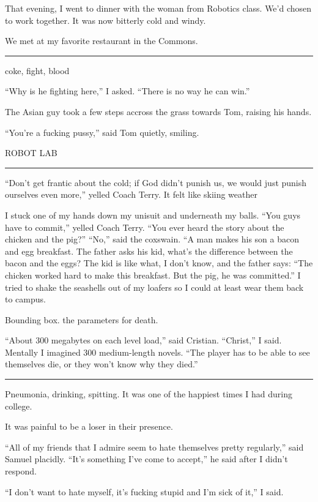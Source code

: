 That evening, I went to dinner with the woman from Robotics class.  We'd chosen
to work together.  It was now bitterly cold and windy.

We met at my favorite restaurant in the Commons.

\plainfancybreak{12pt}{2}{* * *}

coke, fight, blood

``Why is he fighting here,'' I asked.  ``There is no way he can win.'' 

The Asian guy took a few steps accross the grass towards Tom, raising his hands.

``You're a fucking pussy,'' said Tom quietly, smiling. 


ROBOT LAB

\plainfancybreak{12pt}{2}{* * *}

``Don't get frantic about the cold; if God didn't punish us, we would just
punish ourselves even more,'' yelled Coach Terry.  It felt like skiing weather

I stuck one of my hands down my unisuit and underneath my balls.  ``You guys
have to commit,'' yelled Coach Terry.  ``You ever heard the story about the
chicken and the pig?'' ``No,'' said the coxswain.  ``A man makes his son a bacon
and egg breakfast.  The father asks his kid, what's the difference between the
bacon and the eggs?  The kid is like what, I don't know, and the father says:
``The chicken worked hard to make this breakfast.  But the pig, he was
committed.'' I tried to shake the seashells out of my loafers so I could at
least wear them back to campus. 

Bounding box.  the parameters for death.

``About 300 megabytes on each level load,'' said Cristian.  ``Christ,'' I said.
Mentally I imagined 300 medium-length novels.  ``The player has to be able to
see themselves die, or they won't know why they died.'' 

\plainfancybreak{12pt}{2}{* * *}


Pneumonia, drinking, spitting.  It was one of the happiest times I had during college.

It was painful to be a loser in their presence.  

``All of my friends that I admire seem to hate themselves pretty regularly,''
said Samuel placidly.  ``It's something I've come to accept,'' he said after I
didn't respond.

``I don't want to hate myself, it's fucking stupid and I'm sick of it,'' I said.  

